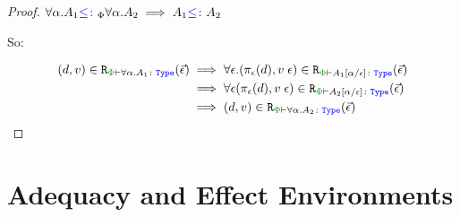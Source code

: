 \begin{framed}
\begin{proof}
    \case{\squant}
    $\forall \alpha. A_1{\color{blue} \leq\colon}_\Phi \forall \alpha. A_2\implies A_1{\color{blue} \leq\colon} A_2$
    
    So:
    
    \begin{align*}
        \inLogRelPE{d}{v}{\all{\a}{A_1}} & \implies \forall \e.\inLogRelPE{\pe(d)}{\eapp{v}{\e}}{A_1\ssub{\e}{\a}}\\
        & \implies \forall\e \inLogRelPE{\pe(d)}{\eapp{v}{\e}}{A_2\ssub{\e}{\a}}\\
        & \implies \inLogRelPE{d}{v}{\all{\a}{A_2}}
    \end{align*}
    \end{proof}
    
\end{framed}

\section{Adequacy and Effect Environments}
\label{AdequacyEnvironmentsProof}

